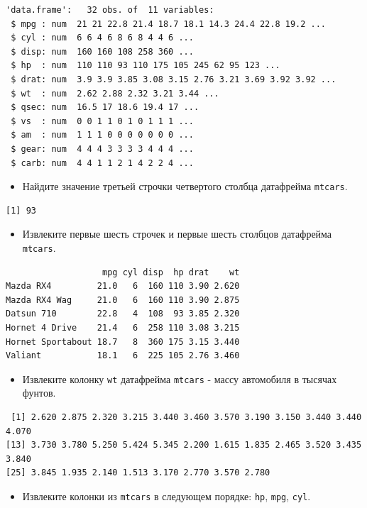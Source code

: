 \documentclass[
]{book}
\providecommand{\tightlist}{%
  \setlength{\itemsep}{0pt}\setlength{\parskip}{0pt}}
\begin{document}
\begin{verbatim}
'data.frame':   32 obs. of  11 variables:
 $ mpg : num  21 21 22.8 21.4 18.7 18.1 14.3 24.4 22.8 19.2 ...
 $ cyl : num  6 6 4 6 8 6 8 4 4 6 ...
 $ disp: num  160 160 108 258 360 ...
 $ hp  : num  110 110 93 110 175 105 245 62 95 123 ...
 $ drat: num  3.9 3.9 3.85 3.08 3.15 2.76 3.21 3.69 3.92 3.92 ...
 $ wt  : num  2.62 2.88 2.32 3.21 3.44 ...
 $ qsec: num  16.5 17 18.6 19.4 17 ...
 $ vs  : num  0 0 1 1 0 1 0 1 1 1 ...
 $ am  : num  1 1 1 0 0 0 0 0 0 0 ...
 $ gear: num  4 4 4 3 3 3 3 4 4 4 ...
 $ carb: num  4 4 1 1 2 1 4 2 2 4 ...
\end{verbatim}

\begin{itemize}
\tightlist
\item
  Найдите значение третьей строчки четвертого столбца датафрейма \texttt{mtcars}.
\end{itemize}

\begin{verbatim}
[1] 93
\end{verbatim}

\begin{itemize}
\tightlist
\item
  Извлеките первые шесть строчек и первые шесть столбцов датафрейма \texttt{mtcars}.
\end{itemize}

\begin{verbatim}
                   mpg cyl disp  hp drat    wt
Mazda RX4         21.0   6  160 110 3.90 2.620
Mazda RX4 Wag     21.0   6  160 110 3.90 2.875
Datsun 710        22.8   4  108  93 3.85 2.320
Hornet 4 Drive    21.4   6  258 110 3.08 3.215
Hornet Sportabout 18.7   8  360 175 3.15 3.440
Valiant           18.1   6  225 105 2.76 3.460
\end{verbatim}

\begin{itemize}
\tightlist
\item
  Извлеките колонку \texttt{wt} датафрейма \texttt{mtcars} - массу автомобиля в тысячах фунтов.
\end{itemize}

\begin{verbatim}
 [1] 2.620 2.875 2.320 3.215 3.440 3.460 3.570 3.190 3.150 3.440 3.440 4.070
[13] 3.730 3.780 5.250 5.424 5.345 2.200 1.615 1.835 2.465 3.520 3.435 3.840
[25] 3.845 1.935 2.140 1.513 3.170 2.770 3.570 2.780
\end{verbatim}

\begin{itemize}
\tightlist
\item
  Извлеките колонки из \texttt{mtcars} в следующем порядке: \texttt{hp}, \texttt{mpg}, \texttt{cyl}.
\end{itemize}
\end{document}
